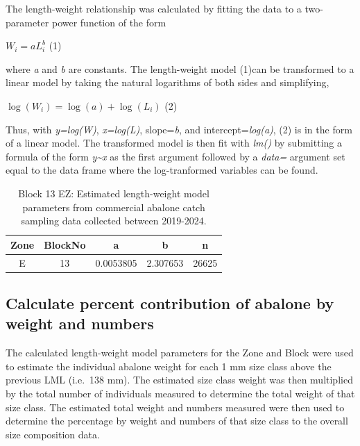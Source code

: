 \documentclass[
]{article}
\begin{document}
The length-weight relationship was calculated by fitting the data to a two-parameter power function of the form

\(W_{i} = aL_{i}^{b}\) (1)

where \emph{a} and \emph{b} are constants. The length-weight model (1)can be transformed to a linear model by taking the natural logarithms of both sides and simplifying,

\(\log(W_{i}) = \log(a) + \log(L_{i})\) (2)

Thus, with \emph{y=log(W)}, \emph{x=log(L)}, slope=\emph{b}, and intercept=\emph{log(a)}, (2) is in the form of a linear model. The transformed model is then fit with \emph{lm()} by submitting a formula of the form \emph{y\textasciitilde x} as the first argument followed by a \emph{data=} argument set equal to the data frame where the log-tranformed variables can be found.

\begin{table}

\caption{\label{tab:lengthweightrelationship}Block 13 EZ: Estimated length-weight model parameters from commercial abalone catch sampling data collected between 2019-2024.}
\centering
\begin{tabular}[t]{ccccc}
\toprule
Zone & BlockNo & a & b & n\\
\midrule
E & 13 & 0.0053805 & 2.307653 & 26625\\
\bottomrule
\end{tabular}
\end{table}

\subsection{Calculate percent contribution of abalone by weight and numbers}\label{calculate-percent-contribution-of-abalone-by-weight-and-numbers}

The calculated length-weight model parameters for the Zone and Block were used to estimate the individual abalone weight for each 1 mm size class above the previous LML (i.e.~138 mm). The estimated size class weight was then multiplied by the total number of individuals measured to determine the total weight of that size class. The estimated total weight and numbers measured were then used to determine the percentage by weight and numbers of that size class to the overall size composition data.
\end{document}
